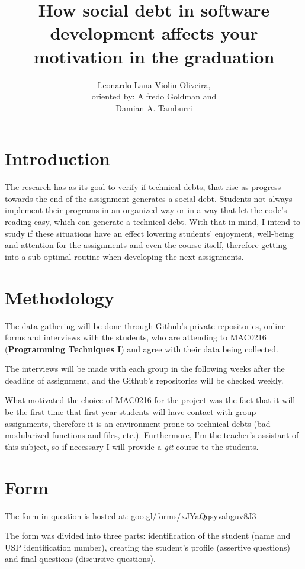 \documentclass[a4paper, 12pt]{article}
\title{How social debt in software development affects your motivation in the graduation}
\author{Leonardo Lana Violin Oliveira, \\ oriented by: Alfredo Goldman and \\ Damian A. Tamburri }
\begin{document}
\maketitle

\section*{Introduction}
The research has as its goal to verify if technical debts, that rise as progress towards the end of
the assignment generates a social debt. Students not always implement their programs
in an organized way or in a way that let the code's reading easy, which can generate a
technical debt. With that in mind, I intend to study if these situations have an effect
lowering students' enjoyment, well-being and  attention for the assignments and even the
course itself, therefore getting into a sub-optimal routine when developing the
next assignments.

\section*{Methodology}
The data gathering will be done through Github's private repositories, online forms
and interviews with the students, who are attending to MAC0216
(\textbf{Programming Techniques I}) and agree with their data being collected.

The interviews will be made with each group in the following weeks after the deadline of
assignment, and the Github's repositories will be checked weekly.

What motivated the choice of MAC0216 for the project was the fact that it will be the first
time that first-year students will have contact with group assignments, therefore it is
an environment prone to technical debts (bad modularized functions and files, etc.).
Furthermore, I'm the teacher's assistant of this subject, so if necessary I will provide
a \textit{git} course to the students.

\section*{Form}
The form in question is hosted at: \url{goo.gl/forms/xJYaQqsyvahguv8J3}

The form was divided into three parts: identification of the student (name and
USP identification number), creating the student's profile (assertive questions)
and final questions (discursive questions).
\end{document}
